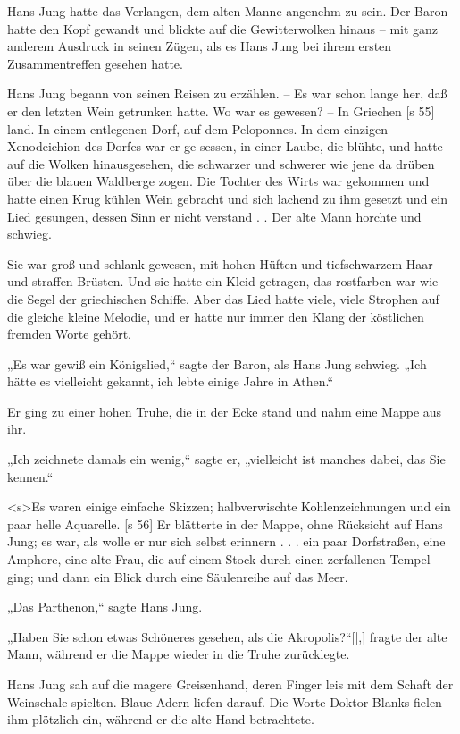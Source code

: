 Hans Jung hatte das Verlangen, dem alten Manne
angenehm zu sein. Der Baron hatte den Kopf gewandt
und blickte auf die Gewitterwolken hinaus – mit
ganz anderem Ausdruck in seinen Zügen, als es Hans
Jung bei ihrem ersten Zusammentreffen gesehen hatte.

Hans Jung begann von seinen Reisen zu erzählen.
– Es war schon lange her, daß er den letzten Wein
getrunken hatte. Wo war es gewesen? – In Griechen­
[s 55]
land. In einem entlegenen Dorf, auf dem Peloponnes.
In dem einzigen Xenodeichion des Dorfes war er ge­
sessen, in einer Laube, die blühte, und hatte auf die
Wolken hinausgesehen, die schwarzer und schwerer
wie jene da drüben über die blauen Waldberge zogen.
Die Tochter des Wirts war gekommen und hatte
einen Krug kühlen Wein gebracht und sich lachend
zu ihm gesetzt und ein Lied gesungen, dessen Sinn
er nicht verstand . . Der alte Mann horchte und
schwieg.

Sie war groß und schlank gewesen, mit hohen
Hüften und tiefschwarzem Haar und straffen Brüsten.
Und sie hatte ein Kleid getragen, das rostfarben war
wie die Segel der griechischen Schiffe. Aber das
Lied hatte viele, viele Strophen auf die gleiche kleine
Melodie, und er hatte nur immer den Klang der
köstlichen fremden Worte gehört.

„Es war gewiß ein Königslied,“ sagte der Baron,
als Hans Jung schwieg. „Ich hätte es vielleicht gekannt,
ich lebte einige Jahre in Athen.“

Er ging zu einer hohen Truhe, die in der Ecke
stand und nahm eine Mappe aus ihr.

„Ich zeichnete damals ein wenig,“ sagte er,
„vielleicht ist manches dabei, das Sie kennen.“

<s>Es waren einige einfache Skizzen; halbverwischte
Kohlenzeichnungen und ein paar helle Aquarelle.
[s 56]
Er blätterte in der Mappe, ohne Rücksicht auf Hans
Jung; es war, als wolle er nur sich selbst erinnern . . .
ein paar Dorfstraßen, eine Amphore, eine alte Frau,
die auf einem Stock durch einen zerfallenen Tempel
ging; und dann ein Blick durch eine Säulenreihe auf
das Meer.

„Das Parthenon,“ sagte Hans Jung.

„Haben Sie schon etwas Schöneres gesehen, als
die Akropolis?“[|,] fragte der alte Mann, während er
die Mappe wieder in die Truhe zurücklegte.

Hans Jung sah auf die magere Greisenhand,
deren Finger leis mit dem Schaft der Weinschale
spielten. Blaue Adern liefen darauf. Die Worte
Doktor Blanks fielen ihm plötzlich ein, während er
die alte Hand betrachtete.


